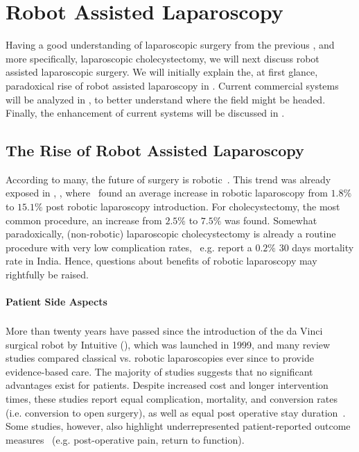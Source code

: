 \section{Robot Assisted Laparoscopy}
\label{in:sec:robot_assisted_laparoscopy}
Having a good understanding of laparoscopic surgery from the previous , and more specifically, laparoscopic cholecystectomy, we will next discuss robot assisted laparoscopic surgery. We will initially explain the, at first glance, paradoxical rise of robot assisted laparoscopy in . Current commercial systems will be analyzed in , to better understand where the field might be headed. Finally, the enhancement of current systems will be discussed in .

\subsection{The Rise of Robot Assisted Laparoscopy}
\label{in:sec:the_rise_of_robot_assisted_laparoscopy}
According to many, the future of surgery is robotic~\cite{times2021better}. This trend was already exposed in , , where~\citet{sheetz2020trends} found an average increase in robotic laparoscopy from $1.8\%$ to $15.1\%$ post robotic laparoscopy introduction. For cholecystectomy, the most common procedure, an increase from $2.5\%$ to $7.5\%$ was found. Somewhat paradoxically, (non-robotic) laparoscopic cholecystectomy is already a routine procedure with very low complication rates,~\citet{thapar2023evaluation} e.g. report a $0.2\%$ 30 days mortality rate in India. Hence, questions about benefits of robotic laparoscopy may rightfully be raised.

\paragraph{Patient Side Aspects} More than twenty years have passed since the introduction of the da Vinci\textsuperscript{\textregistered} surgical robot by Intuitive (), which was launched in 1999, and many review studies compared classical vs. robotic laparoscopies ever since to provide evidence-based care. The majority of studies suggests that no significant advantages exist for patients. Despite increased cost and longer intervention times, these studies report equal complication, mortality, and conversion rates (i.e. conversion to open surgery), as well as equal post operative stay duration~\cite{kawka2023laparoscopic, csirzo2023robot}. Some studies, however, also highlight underrepresented patient-reported outcome measures~\cite{kawka2023laparoscopic} (e.g. post-operative pain, return to function). 

